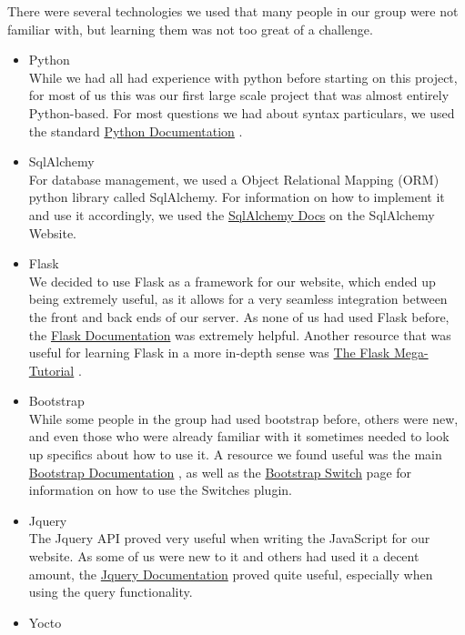 There were several technologies we used that many people in our group were not familiar with, but learning them was not too great of a challenge.

\begin{itemize}
	\item Python \\
	While we had all had experience with python before starting on this project, for most of us this was our first large scale project that was almost entirely Python-based. For most questions we had about syntax particulars, we used the standard \href{https://docs.python.org/}{Python Documentation} \cite{python}.
	\item SqlAlchemy \\
	For database management, we used a Object Relational Mapping (ORM) python library called SqlAlchemy. For information on how to implement it and use it accordingly, we used the \href{http://docs.sqlalchemy.org/}{SqlAlchemy Docs} \cite{sqlalchemy} on the SqlAlchemy Website.
	\item Flask \\
	We decided to use Flask as a framework for our website, which ended up being extremely useful, as it allows for a very seamless integration between the front and back ends of our server. As none of us had used Flask before, the \href{http://flask.pocoo.org/docs/}{Flask Documentation} \cite{flask} was extremely helpful. Another resource that was useful for learning Flask in a more in-depth sense was \href{http://blog.miguelgrinberg.com/post/the-flask-mega-tutorial-part-i-hello-world/}{The Flask Mega-Tutorial} \cite{flaskmega}.
	\item Bootstrap \\
	While some people in the group had used bootstrap before, others were new, and even those who were already familiar with it sometimes needed to look up specifics about how to use it. A resource we found useful was the main \href{http://getbootstrap.com/}{Bootstrap Documentation} \cite{bootstrap}, as well as the \href{http://bootstrap-switch.org/}{Bootstrap Switch} \cite{bootstrapswitch} page for information on how to use the Switches plugin.
	\item Jquery \\
	The Jquery API proved very useful when writing the JavaScript for our website. As some of us were new to it and others had used it a decent amount, the \href{http://api.jquery.com/}{Jquery Documentation} \cite{jquery} proved quite useful, especially when using the query functionality.
	\item Yocto \\

\end{itemize}
